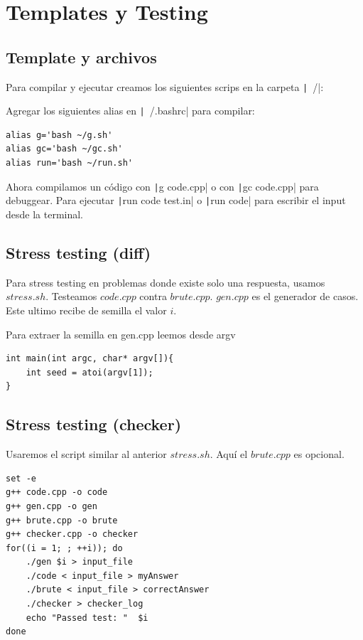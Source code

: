 
\section{Templates y Testing}

\subsection{Template y archivos}


Para compilar y ejecutar creamos los siguientes scrips en la carpeta \texttt|~/|:

Agregar los siguientes alias en \texttt|~/.bashrc| para compilar:
\begin{verbatim}
alias g='bash ~/g.sh'
alias gc='bash ~/gc.sh'
alias run='bash ~/run.sh'
\end{verbatim}
Ahora compilamos un código con \texttt|g code.cpp| o con \texttt|gc code.cpp| para debuggear. Para ejecutar \texttt|run code test.in| o \texttt|run code| para escribir el input desde la terminal.

\subsection{Stress testing (diff)}
Para stress testing en problemas donde existe solo una respuesta, usamos $stress.sh$. Testeamos $code.cpp$ contra $brute.cpp$. $gen.cpp$ es el generador de casos. Este ultimo recibe de semilla el valor $i$.


Para extraer la semilla en gen.cpp leemos desde argv
\begin{verbatim}
int main(int argc, char* argv[]){
    int seed = atoi(argv[1]);
}
\end{verbatim}


\subsection{Stress testing (checker)}
Usaremos el script similar al anterior $stress.sh$. Aquí el $brute.cpp$ es opcional.

\begin{verbatim}
set -e
g++ code.cpp -o code
g++ gen.cpp -o gen
g++ brute.cpp -o brute
g++ checker.cpp -o checker
for((i = 1; ; ++i)); do
    ./gen $i > input_file
    ./code < input_file > myAnswer
    ./brute < input_file > correctAnswer
    ./checker > checker_log
    echo "Passed test: "  $i
done
\end{verbatim}

